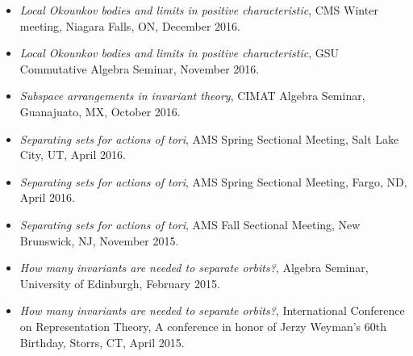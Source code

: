 \documentclass[12pt]{amsart}
\begin{document}
\begin{itemize}[leftmargin=9mm]
	\item \emph{Local Okounkov bodies and limits in positive characteristic}, CMS Winter meeting, Niagara Falls, ON, December 2016.

	\item \emph{Local Okounkov bodies and limits in positive characteristic}, GSU Commutative Algebra Seminar, November 2016.

	\item \emph{Subspace arrangements in invariant theory}, CIMAT Algebra Seminar, Guanajuato, MX, October 2016.


	
	\item \emph{Separating sets for actions of tori}, AMS Spring Sectional Meeting, Salt Lake City, UT, April 2016.
	\item \emph{Separating sets for actions of tori}, AMS Spring Sectional Meeting, Fargo, ND, April 2016.

	\item \emph{Separating sets for actions of tori}, AMS Fall Sectional Meeting, New Brunswick, NJ, November 2015.


	\item \emph{How many invariants are needed to separate
		orbits?}, Algebra Seminar, University of Edinburgh, February 2015.
	\item \emph{How many invariants are needed to separate
		orbits?}, International Conference on Representation Theory, A conference in honor of Jerzy Weyman's 60th Birthday, Storrs, CT, April 2015.
	


\end{itemize}
\end{document}
